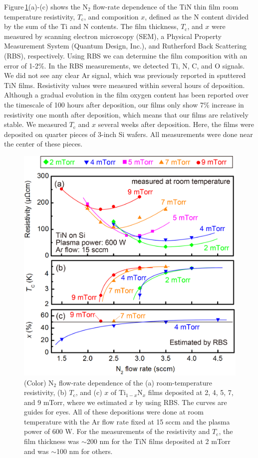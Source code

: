 \documentclass{report}
\begin{document}
Figure\,\ref{BasicProperties}(a)-(c) shows the N$_{2}$ flow-rate dependence of the TiN thin film room temperature resistivity, $T_{\text{c}}$, and composition $x$, defined as the N content divided by the sum of the Ti and N contents. The film thickness,  $T_{\text{c}}$, and $x$ were measured by scanning electron microscopy (SEM), a Physical Property Measurement System (Quantum Design, Inc.), and Rutherford Back Scattering (RBS), respectively. Using RBS we can determine the film composition with an error of 1-2\%. In the RBS measurements, we detected Ti, N, C, and O signals. We did not see any clear Ar signal, which was previously reported in sputtered TiN films.\cite{Williams1987}  Resistivity values were measured within several hours of deposition.  Although a gradual evolution in the film oxygen content has been reported over the timescale of 100 hours after deposition\cite{Logothetidis1999}, our films only show 7\% increase in resistivity one month after deposition, which means that our films are relatively stable.  We measured $T_{\text{c}}$ and $x$ several weeks after deposition. Here, the films were deposited on quarter pieces of 3-inch Si wafers.  All measurements were done near the center of these pieces.

\begin{figure}
\begin{center}
\includegraphics{BasicProperties.jpg}
\end{center}
\caption{(Color) N$_{2}$ flow-rate dependence of the (a) room-temperature resistivity, (b) $T_{\text{c}}$, and (c) $x$ of Ti$_{1-x}$N$_{x}$ films deposited at 2, 4, 5, 7, and 9 mTorr, where we estimated $x$ by using RBS. The curves are guides for eyes. All of these depositions were done at room temperature with the Ar flow rate fixed at 15 sccm and the plasma power of 600 W. For the measurements of the resistivity and $T_{\text{c}}$, the film thickness was $\sim$200 nm for the TiN films deposited at 2 mTorr and was $\sim$100 nm for others.}
\label{BasicProperties}
\end{figure}
\end{document}
